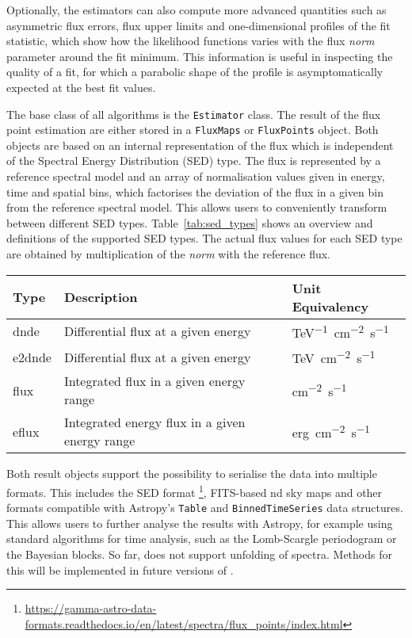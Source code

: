 \documentclass[longauth]{aa}
\newcommand{\code}[1]{\texttt{#1}}
\begin{document}
Optionally, the estimators can also compute more advanced quantities
such as asymmetric flux errors, flux upper limits
and one-dimensional profiles of the fit statistic,
which show how the likelihood functions varies with
the flux \textit{norm} parameter around the fit minimum.
This information is useful in inspecting the quality
of a fit, for which a parabolic
shape of the profile is asymptomatically expected at the best fit
values.

The base class of all algorithms is the \code{Estimator}  class.
The result of the flux point estimation are either stored in a
\code{FluxMaps} or \code{FluxPoints} object. Both objects
are based on an internal representation of the flux which is
independent of the Spectral Energy Distribution (SED) type. The flux is represented
by a reference spectral model and an array of
normalisation values given in energy, time and spatial bins,
which factorises the deviation of the flux in a given
bin from the reference spectral model. This allows
users to conveniently transform between different
SED types. Table~\ref{tab:sed_types} shows an
overview and definitions of the supported SED types.
The actual flux values for each SED type are obtained
by multiplication of the \textit{norm} with the reference flux.

\begin{table*}
    \begin{center}
        \begin{tabular}{lll}
         \hline
         Type & Description & Unit Equivalency \\
         \hline
         dnde & Differential flux at a given energy & \si{TeV^{-1}.cm^{-2}.s^{-1}} \\
         e2dnde & Differential flux at a given energy  & \si{TeV.cm^{-2}.s^{-1}} \\
         flux & Integrated flux in a given energy range & \si{cm^{-2}.s^{-1}} \\
         eflux & Integrated energy flux in a given energy range & \si{erg.cm^{-2}.s^{-1}}\\
         \hline
        \end{tabular}
    \end{center}
    \caption{Definition of the different SED types supported in \gammapy.}
    \label{tab:sed_types}
\end{table*}


Both result objects support the possibility to serialise
the data into multiple formats. This includes the
\gadf SED format \footnote{\url{https://gamma-astro-data-formats.readthedocs.io/en/latest/spectra/flux_points/index.html}},
FITS-based nd sky maps and other formats compatible with Astropy's \code{Table} and
\code{BinnedTimeSeries} data structures. This allows
users to further analyse the results with Astropy, for example using
standard algorithms for time analysis, such as
the Lomb-Scargle periodogram or the Bayesian
blocks. So far, \gammapy does not support unfolding of \gammaray spectra.
Methods for this will be implemented in future versions of \gammapy.
\end{document}
